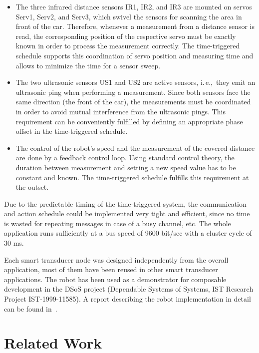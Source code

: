 \documentclass[11pt,a4paper,]{article}
\def\ie{i.\,e.,~}
\begin{document}
\begin{itemize}

\item The three infrared distance sensors IR1, IR2, and IR3 are
mounted on servos Serv1, Serv2, and Serv3, which swivel the
sensors for scanning the area in front of the car. Therefore,
whenever a measurement from a distance sensor is read, the
corresponding position of the respective servo must be exactly
known in order to process the measurement correctly. The
time-triggered schedule supports this coordination of servo
position and measuring time and allows to minimize the time for a
sensor sweep.

\item The two ultrasonic sensors US1 and US2 are active sensors,
\ie they emit an ultrasonic ping when performing a measurement.
Since both sensors face the same direction (the front of the car),
the measurements must be coordinated in order to avoid mutual
interference from the ultrasonic pings. This requirement can be
conveniently fulfilled by defining an appropriate phase offset in
the time-triggered schedule.

\item The control of the robot's speed and the measurement of the
covered distance are done by a feedback control loop. Using
standard control theory, the duration between measurement and
setting a new speed value has to be constant and known. The
time-triggered schedule fulfills this requirement at the outset.

\end{itemize}



Due to the predictable timing of the time-triggered system, the
communication and action schedule could be implemented very tight
and efficient, since no time is wasted for repeating messages in
case of a busy channel, etc. The whole application runs
sufficiently at a bus speed of 9600 bit/sec with a cluster cycle
of 30 ms.

Each smart transducer node was designed independently from the
overall application, most of them have been reused in other smart
transducer applications.
The robot has been used as a demonstrator for composable development
in the DSoS project (Dependable Systems of Systems, IST Research
Project IST-1999-11585). A report describing the robot
implementation in detail can be found in~\cite{dsos:pce3}.

\section{Related Work} \label{sec:relatedwork}
\end{document}
